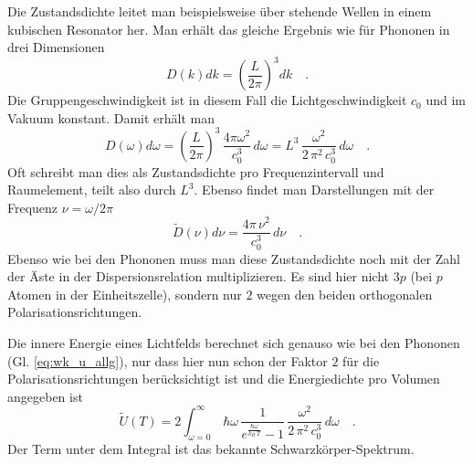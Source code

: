 Die Zustandsdichte leitet man beispielsweise über stehende Wellen in einem kubischen Resonator her. Man erhält das gleiche Ergebnis wie für Phononen in drei Dimensionen
\begin{equation}
D(k) dk = \left( \frac{L}{2 \pi} \right)^3  dk \quad .
\end{equation}
Die Gruppengeschwindigkeit ist in diesem Fall die Lichtgeschwindigkeit $c_0$ und im Vakuum konstant. Damit erhält man
\begin{equation}
D(\omega) d\omega = \left( \frac{L}{2 \pi} \right)^3 \, \frac{4 \pi \omega^2}{c_0^3} \, d\omega 
= L^3 \, \frac{\omega^2}{2 \, \pi^2 \, c_0^3} \, d\omega \quad .
\end{equation}
Oft schreibt man dies als Zustandsdichte pro Frequenzintervall und Raumelement, teilt also durch $L^3$. Ebenso findet man Darstellungen mit der Frequenz $\nu = \omega / 2 \pi$
\begin{equation}
\tilde{D}(\nu) d\nu 
= \frac{4 \pi \, \nu^2}{ c_0^3} \, d\nu \quad .
\end{equation}
Ebenso wie bei den Phononen muss man diese Zustandsdichte noch mit der Zahl der Äste in der Dispersionsrelation multiplizieren. Es sind hier nicht $3p$ (bei $p$ Atomen in der Einheitszelle), sondern nur $2$ wegen den beiden orthogonalen Polarisationsrichtungen.

Die innere Energie eines Lichtfelds berechnet sich genauso wie bei den Phononen (Gl. \ref{eq:wk_u_allg}), nur dass hier nun schon der Faktor $2$ für die Polarisationsrichtungen berücksichtigt ist und die Energiedichte pro Volumen angegeben ist
\begin{equation}
\tilde{U}(T) = 2  \int_{\omega=0}^{\infty} \, \hbar \omega \, 
\frac{1}{e^{\frac{\hbar \omega}{k_B \, T} }- 1}
\, \frac{\omega^2}{2 \, \pi^2 \, c_0^3} \, d\omega \quad .
\end{equation}
Der Term unter dem Integral  ist das bekannte Schwarzkörper-Spektrum.






\printbibliography[segment=\therefsegment,heading=subbibliography]
